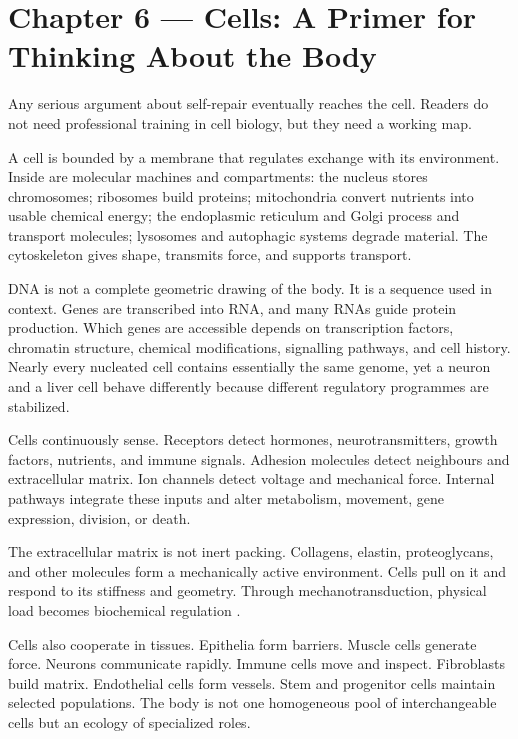 \chapter{Chapter 6 --- Cells: A Primer for Thinking About the Body}\label{chapter-6-cells-a-primer-for-thinking-about-the-body}

Any serious argument about self-repair eventually reaches the cell. Readers do not need professional training in cell biology, but they need a working map.

A cell is bounded by a membrane that regulates exchange with its environment. Inside are molecular machines and compartments: the nucleus stores chromosomes; ribosomes build proteins; mitochondria convert nutrients into usable chemical energy; the endoplasmic reticulum and Golgi process and transport molecules; lysosomes and autophagic systems degrade material. The cytoskeleton gives shape, transmits force, and supports transport.

DNA is not a complete geometric drawing of the body. It is a sequence used in context. Genes are transcribed into RNA, and many RNAs guide protein production. Which genes are accessible depends on transcription factors, chromatin structure, chemical modifications, signalling pathways, and cell history. Nearly every nucleated cell contains essentially the same genome, yet a neuron and a liver cell behave differently because different regulatory programmes are stabilized.

Cells continuously sense. Receptors detect hormones, neurotransmitters, growth factors, nutrients, and immune signals. Adhesion molecules detect neighbours and extracellular matrix. Ion channels detect voltage and mechanical force. Internal pathways integrate these inputs and alter metabolism, movement, gene expression, division, or death.

The extracellular matrix is not inert packing. Collagens, elastin, proteoglycans, and other molecules form a mechanically active environment. Cells pull on it and respond to its stiffness and geometry. Through mechanotransduction, physical load becomes biochemical regulation \autocite{humphrey2014mechanotransduction,ingber2006cellular}.

Cells also cooperate in tissues. Epithelia form barriers. Muscle cells generate force. Neurons communicate rapidly. Immune cells move and inspect. Fibroblasts build matrix. Endothelial cells form vessels. Stem and progenitor cells maintain selected populations. The body is not one homogeneous pool of interchangeable cells but an ecology of specialized roles.

